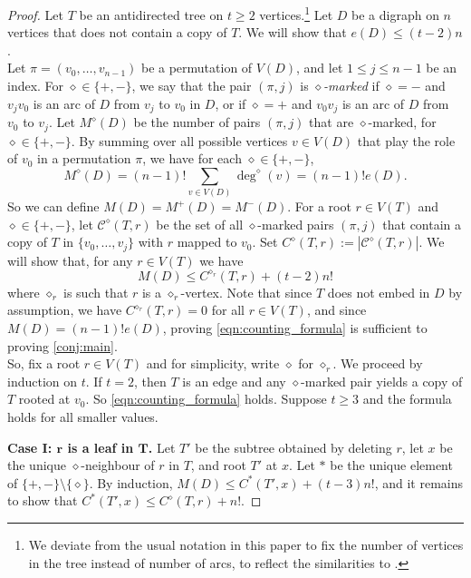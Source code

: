 \documentclass[11pt]{article}
\numberwithin{equation}{section}
\renewcommand{\geq}{\geqslant}
\renewcommand{\leq}{\leqslant}
\newcommand{\defi}[1]{\emph{\color{red!50!black}#1}}
\theoremstyle{definition}
\begin{document}
\begin{proof}
Let $T$ be an antidirected tree on $t\geq 2$ vertices.\footnote{We deviate from the usual notation in this paper to fix the number of vertices in the tree instead of number of arcs, to reflect the similarities to \cite{AI_pdf}.}
Let $D$ be a digraph on $n$ vertices that does not contain a copy of $T$. We will show that $e(D)\leq (t-2)n$.
\\
Let $\pi = (v_0,\dots,v_{n-1})$ be a permutation of $V(D)$, and let $1\leq j \leq n-1$ be an index. For $\diamond\in\{+,-\}$, we say that the pair $(\pi,j)$ is \defi{$\diamond$-marked} if $\diamond=-$ and  $v_jv_0$ is an arc of $D$ from $v_j$ to $v_0$ in $D$, or if $\diamond=+$ and  $v_0v_j$ is an arc of $D$  from $v_0$ to $v_j$. 
Let $M^\diamond(D)$ be the number of pairs $(\pi,j)$ that are $\diamond$-marked, for $\diamond\in\{+,-\}$. By summing over all possible vertices $v\in V(D)$ that  play the role of $v_0$ in a permutation $\pi$, we have for each $\diamond\in\{+,-\}$,
\begin{equation*}
    M^\diamond(D) = (n-1)!\sum_{v\in V(D)}\deg^\diamond(v) = (n-1)! e(D).
\end{equation*}
So we can define $M(D)=M^+(D)=M^-(D)$. 
For a root $r\in V(T)$ and $\diamond\in\{+,-\}$, let  $\mathcal C^\diamond(T,r)$ be the set of all  $\diamond$-marked pairs $(\pi,j)$ that contain a copy of $T$ in $\{v_0,\dots,v_j\}$ with $r$ mapped to $v_0$. Set $C^\diamond(T,r):=|\mathcal C^\diamond(T,r)|$. We will show that, for any $r\in V(T)$   we have
\begin{equation}\label{eqn:counting_formula}
   M(D) \leq C^{\diamond_r}(T,r) + (t-2)n!
\end{equation}
where $\diamond_r$ is such that $r$ is a $\diamond_r$-vertex. 
Note that since $T$ does not embed in $D$ by assumption, we have $C^{\diamond_r}(T,r) = 0$ for all $r\in V(T)$, and since $M(D)= (n-1)!e(D)$, proving \cref{eqn:counting_formula} is sufficient to proving \cref{conj:main}.
\\
So, fix a root $r\in V(T)$ and for simplicity, write $\diamond$ for $\diamond_r$.
 We proceed by induction on $t$. If $t = 2$, then $T$ is an edge and any $\diamond$-marked pair yields a copy of $T$ rooted at $v_0$. So  \cref{eqn:counting_formula} holds. Suppose $t\geq 3$ and the formula holds for all smaller values.

\textbf{Case I: $\boldsymbol{r}$ is a leaf in $\boldsymbol{T}$. }
Let $T'$ be the subtree obtained by deleting $r$,  let $x$ be the unique $\diamond$-neighbour of $r$ in $T$, and root $T'$ at $x$. Let $*$ be the unique element of $\{+,-\}\setminus \{\diamond\}$. By induction, $M(D)\leq C^{\ast}(T',x)+(t-3)n!$, and it remains to show that $C^\ast(T',x)\leq C^\diamond (T,r)+ n!$.



\end{proof}
\end{document}

